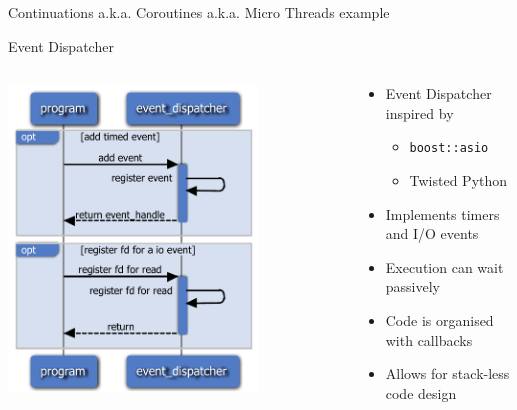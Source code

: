 \documentclass{beamer}
\begin{document}
\begin{frame}{Continuations a.k.a. Coroutines a.k.a. Micro Threads example}
    
\end{frame}

\begin{frame}{Event Dispatcher}
    \begin{columns}
        \begin{column}{0.5\textwidth}
            \centerline{\includegraphics[width=0.75\textwidth]{design-intro.slides/evtd_basics.pdf}}
        \end{column}
        \pause
        \begin{column}{0.5\textwidth}
            \begin{itemize}[<+->]
                \item Event Dispatcher inspired by
                    \begin{itemize}[<+->]
                        \item \texttt{boost::asio}
                        \item Twisted Python
                    \end{itemize}
                \item Implements timers and I/O events
                \item Execution can wait passively
                \item Code is organised with callbacks
                \item Allows for stack-less code design
            \end{itemize}
        \end{column}
    \end{columns}
\end{frame}
\end{document}
